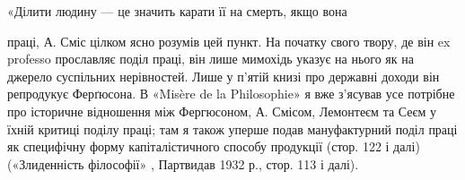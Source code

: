 «Ділити людину — це значить карати її на смерть, якщо вона

праці, А. Сміс цілком ясно розумів цей пункт. На початку свого твору,
де він ex professo прославляє поділ праці, він лише мимохідь указує на
нього як на джерело суспільних нерівностей. Лише у п’ятій книзі про
державні доходи він репродукує Ферґюсона. В «Misère de la Philosophie»
я вже з’ясував усе потрібне про історичне відношення між Фергюсоном,
А. Смісом, Лемонтеєм та Сеєм у їхній критиці поділу праці; там
я також уперше подав мануфактурний поділ праці як специфічну форму
капіталістичного способу продукції (стор. 122 і далі) («Злиденність філософії»
, Партвидав 1932 р., стор. 113 і далі).